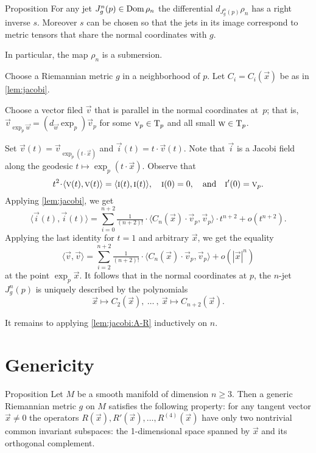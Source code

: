 \documentclass[a4paper,10pt]{article}
\begin{document}
\begin{thm}{Proposition}\label{prop:submersion}
For any jet $J^n_g(p)\z\in \Dom \rho_n$ the differential $d_{J^n_g(p)}\rho_n$ has a right inverse $s$.
Moreover $s$ can be chosen so that the jets in its image correspond to metric tensors that share the normal coordinates with $g$.

In particular, the map $\rho_n$ is a submersion.
\end{thm}

Choose a Riemannian metric $g$ in a neighborhood of $p$.
Let $C_i=C_i(\vec{x})$ be as in \ref{lem:jacobi}.

Choose a vector filed $\vec{v}$ that is parallel in the normal coordinates at~$p$;
that is, $\vec{v}_{\exp_p\vec{w}}=(d_\vec{w}\exp_p)\vec{v}_p$ for some $\text{\sc{v}}_p\in\mathrm{T}_p$ and all small $\text{\sc{w}}\in \mathrm{T}_p$.

Set $\vec{v}(t)=\vec{v}_{\exp_p(t\cdot \vec{x})}$ and $\vec{i}(t)=t\cdot \vec{v}(t)$.
Note that $\vec{i}$ is a Jacobi field along the geodesic $t\mapsto \exp_p(t\cdot \vec{x})$.
Observe that 
\[t^2\cdot \langle \vec{v}(t),
\vec{v}(t)\rangle=\langle \vec{i}(t), \vec{i}(t)\rangle,
\quad 
\vec{i}(0)=0,
\quad 
\text{and} \quad 
\vec{i}'(0)\z=\vec{v}_p.\]
Applying \ref{lem:jacobi}, we get
\[\langle\vec{i}(t), \vec{i}(t)\rangle=\sum_{i=0}^{n+2}\tfrac1{(n+2)!}\cdot\langle C_n(\vec{x})\cdot \vec{v}_p,\vec{v}_p\rangle\cdot t^{n+2}+o(t^{n+2}).\]
Applying the last identity for $t=1$ and arbitrary $\vec{x}$, we get the equality
\[\langle\vec{v}, \vec{v}\rangle=\sum_{i=2}^{n+2}\tfrac1{(n+2)!}\cdot\langle C_n(\vec{x})\cdot \vec{v}_p,\vec{v}_p\rangle+o(|\vec{x}|^{n})\]
at the point $\exp_p \vec{x}$.
It follows that in the normal coordinates at $p$,
the $n$-jet $J^n_g(p)$ is uniquely described by the polynomials
\[\vec{x}\mapsto C_2(\vec{x}),
\ \dots\ ,\  
\vec{x}\mapsto C_{n+2}(\vec{x}).\]

It remains to applying \ref{lem:jacobi:A-R} inductively on $n$.
\qeds 

\section{Genericity}

\begin{thm}{Proposition}\label{prop:R'}
Let $M$ be a smooth manifold of dimension $n\ge 3$.
Then a generic Riemannian metric $g$ on $M$ satisfies the following property:
for any tangent vector $\vec{x}\ne 0$ the operators
$R(\vec{x}), R'(\vec{x}), \dots, R^{(4)}(\vec{x})$ have only two nontrivial common invariant subspaces: the 1-dimensional space spanned by $\vec{x}$ and its orthogonal complement.
\end{thm}
\end{document}
